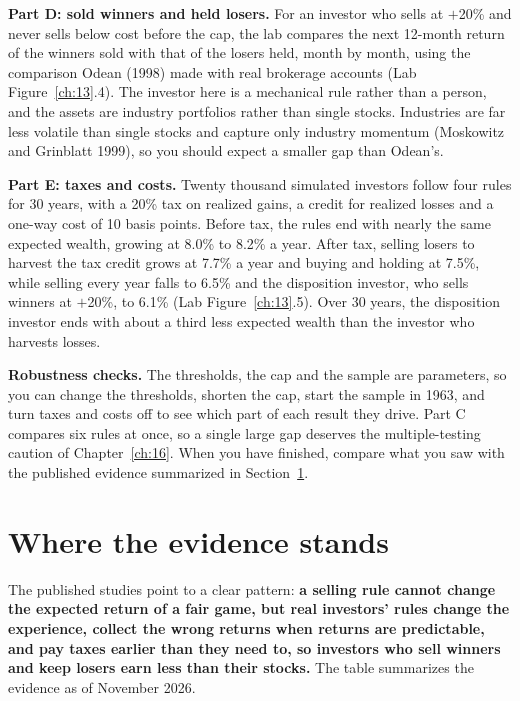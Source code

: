 \textbf{Part D: sold winners and held losers.} For an investor who sells at $+$20\% and never sells below cost before the cap, the lab compares the next 12-month return of the winners sold with that of the losers held, month by month, using the comparison Odean (1998) made with real brokerage accounts (Lab Figure~\ref{ch:13}.4). The investor here is a mechanical rule rather than a person, and the assets are industry portfolios rather than single stocks. Industries are far less volatile than single stocks and capture only industry momentum (Moskowitz and Grinblatt 1999), so you should expect a smaller gap than Odean's.

\textbf{Part E: taxes and costs.} Twenty thousand simulated investors follow four rules for 30 years, with a 20\% tax on realized gains, a credit for realized losses and a one-way cost of 10 basis points. Before tax, the rules end with nearly the same expected wealth, growing at 8.0\% to 8.2\% a year. After tax, selling losers to harvest the tax credit grows at 7.7\% a year and buying and holding at 7.5\%, while selling every year falls to 6.5\% and the disposition investor, who sells winners at $+$20\%, to 6.1\% (Lab Figure~\ref{ch:13}.5). Over 30 years, the disposition investor ends with about a third less expected wealth than the investor who harvests losses.

\label{sec:hp-stress}
\textbf{Robustness checks.} The thresholds, the cap and the sample are parameters, so you can change the thresholds, shorten the cap, start the sample in 1963, and turn taxes and costs off to see which part of each result they drive. Part C compares six rules at once, so a single large gap deserves the multiple-testing caution of Chapter~\ref{ch:16}. When you have finished, compare what you saw with the published evidence summarized in Section~\ref{sec:hp-verdict}.


\section{Where the evidence stands}
\label{sec:hp-verdict}

The published studies point to a clear pattern: \textbf{a selling rule cannot change the expected return of a fair game, but real investors' rules change the experience, collect the wrong returns when returns are predictable, and pay taxes earlier than they need to, so investors who sell winners and keep losers earn less than their stocks.} The table summarizes the evidence as of November 2026.

